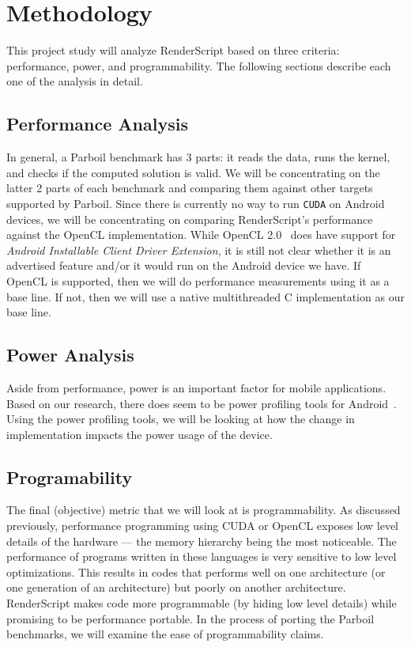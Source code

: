 
\section*{Methodology}

This project study will analyze RenderScript based on three criteria: performance, power, and programmability.
The following sections describe each one of the analysis in detail.


\subsection*{Performance Analysis}

In general, a Parboil benchmark has 3 parts: it reads the data, runs the kernel, and checks if the 
    computed solution is valid.
We will be concentrating on the latter 2 parts of each benchmark and comparing them against other
    targets supported by Parboil.
Since there is currently no way to run {\tt CUDA} on Android devices, we will be concentrating
    on comparing RenderScript's performance against the OpenCL implementation.
While OpenCL 2.0~\cite{OpenCL} does
	have support for \textit{Android Installable Client Driver Extension}, it is still not clear whether 
    it is an advertised feature and/or it would run on the Android device we have.
If OpenCL is supported, then we will do performance measurements using it as a base line.
If not, then we will use a native multithreaded C implementation as our base line.

\subsection*{Power Analysis}

Aside from performance, power is an important factor for mobile applications.
Based on our research, there does seem to be power profiling tools for Android~\cite{Google:2014:Power}.
Using the power profiling tools, we will be looking at how the change in
    implementation impacts the power usage of the device.

\subsection*{Programability}

The final (objective) metric that we will look at is programmability.
As discussed previously, performance programming using CUDA or OpenCL
    exposes low level details of the hardware --- the memory hierarchy being the most noticeable.
The performance of programs written in these languages is very sensitive to low
	level optimizations.
This results in codes that performs well on one architecture (or one generation of an architecture)
    but poorly on another architecture.
RenderScript makes code more programmable (by hiding low level details) while promising to be performance
	portable.
In the process of porting the Parboil benchmarks, we will
	examine the ease of programmability claims.

